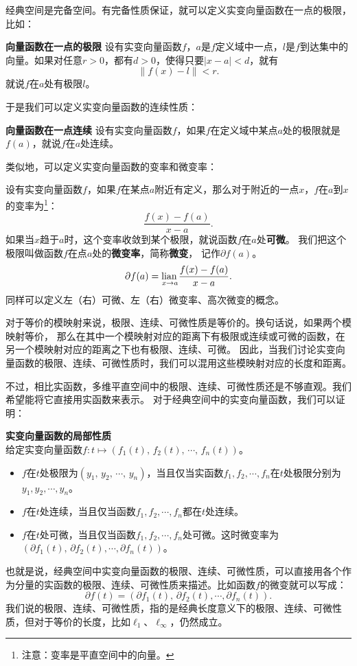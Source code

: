 \documentclass[12pt,UTF8]{ctexbook}
\begin{document}
经典空间是完备空间。有完备性质保证，就可以定义实变向量函数在一点的极限，比如：
\begin{df}{\textbf{向量函数在一点的极限}}
    设有实变向量函数$f$，$a$是$f$定义域中一点，$l$是$f$到达集中的向量。如果对任意$r>0$，都有$d>0$，使得只要$|x - a| < d$，就有
    $$\left\|f(x) - l\right\| < r.$$
    就说$f$在$a$处有极限$l$。
\end{df}

于是我们可以定义实变向量函数的连续性质：
\begin{df}{\textbf{向量函数在一点连续}}
    设有实变向量函数$f$，如果$f$在定义域中某点$a$处的极限就是$f(a)$，就说$f$在$a$处连续。
\end{df}

类似地，可以定义实变向量函数的变率和微变率：
\begin{df}
    设有实变向量函数$f$，如果$f$在某点$a$附近有定义，那么对于附近的一点$x$，$f$在$a$到$x$的变率为\footnote{注意：变率是平直空间中的向量。}：
    $$ \frac{f(x) - f(a)}{x - a}.$$
    如果当$x$趋于$a$时，这个变率收敛到某个极限，就说函数$f$在$a$处\textbf{可微}。
    我们把这个极限叫做函数$f$在点$a$处的\textbf{微变率}，简称\textbf{微变}，
    记作$\partial f(a)$。
    $$ \partial f(a) = \underset{{x\to a}}{\operatorname{lian}\,} \frac{f(x) - f(a)}{x - a}. $$
    同样可以定义左（右）可微、左（右）微变率、高次微变的概念。
\end{df}

对于等价的模映射来说，极限、连续、可微性质是等价的。换句话说，如果两个模映射等价，
那么在其中一个模映射对应的距离下有极限或连续或可微的函数，在另一个模映射对应的距离之下也有极限、连续、可微。
因此，当我们讨论实变向量函数的极限、连续、可微性质时，我们可以混用这些模映射对应的长度和距离。

不过，相比实函数，多维平直空间中的极限、连续、可微性质还是不够直观。我们希望能将它直接用实函数来表示。
对于经典空间中的实变向量函数，我们可以证明：
\begin{tm}\label{tm:1-1-10}
    \textbf{实变向量函数的局部性质}\\
    给定实变向量函数$f: t\mapsto (f_1(t),\, f_2(t),\, \cdots ,\, f_n(t))$。
    \begin{itemize}
        \item $f$在$t$处极限为$(y_1,\,y_2,\,\cdots,\, y_n)$，当且仅当实函数$f_1,f_2, \cdots, f_n$在$t$处极限分别为$y_1, y_2, \cdots, y_n$。
        \item $f$在$t$处连续，当且仅当函数$f_1,f_2, \cdots, f_n$都在$t$处连续。
        \item $f$在$t$处可微，当且仅当函数$f_1,f_2, \cdots, f_n$处可微。这时微变率为$(\partial f_1(t),\,\partial f_2(t), \cdots, \partial f_n(t))$。
    \end{itemize}
\end{tm}
也就是说，经典空间中实变向量函数的极限、连续、可微性质，可以直接用各个作为分量的实函数的极限、连续、可微性质来描述。比如函数$f$的微变就可以写成：
$$ \partial f (t) = (\partial f_1(t),\,\partial f_2(t), \cdots, \partial f_n(t)). $$
我们说的极限、连续、可微性质，指的是经典长度意义下的极限、连续、可微性质，但对于等价的长度，比如$\ell_1$、$\ell_{\infty}$，仍然成立。
\end{document}
